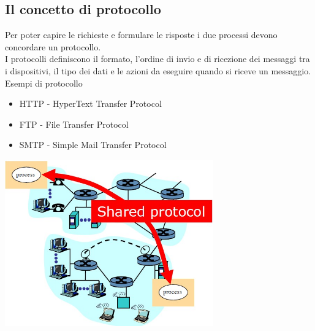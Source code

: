 \subsection{Il concetto di protocollo}
Per poter capire le richieste e formulare le risposte i due processi devono concordare un protocollo.
\\I protocolli definiscono il formato, l'ordine di invio e di ricezione dei messaggi tra i dispositivi, il tipo dei dati e le azioni da eseguire quando si riceve un messaggio.
Esempi di protocollo
\begin{itemize}
    \item HTTP - HyperText Transfer Protocol
    \item FTP - File Transfer Protocol
    \item SMTP - Simple Mail Transfer Protocol
\end{itemize}
\begin{center}
    \includegraphics[width=0.675\textwidth]{img/MOC_protocolli1.jpg}
\end{center}

